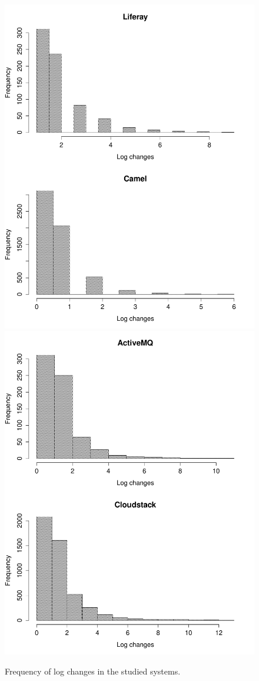 \begin{figure}[tb]
	\centering
	\includegraphics[width=0.7\linewidth]{RQ1_Liferay_Camel_Logchangefreq}
	\includegraphics[width=0.7\linewidth]{RQ1_Cloud_Active_Logchangefreq}
	\caption{Frequency of log changes in the studied systems.}
	\label{fig:RQ1_Liferay_Camel_Logchangefreq}
\end{figure}
